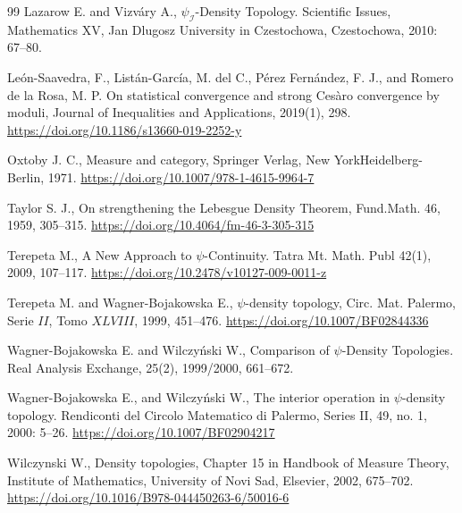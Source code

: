 \documentclass{amsart}
\theoremstyle{plain}
\numberwithin{equation}{section}
\begin{document}
\begin{thebibliography}{99}
Lazarow E. and Vizváry A., $\psi_{\mathcal{I}}$-Density Topology. Scientific Issues, Mathematics XV, Jan Dlugosz University in Czestochowa, Czestochowa, 2010: 67--80.

León-Saavedra, F., Listán-García, M. del C., Pérez Fernández, F. J., and Romero de la Rosa, M. P. On statistical convergence and strong Cesàro convergence by moduli, Journal of Inequalities and Applications, 2019(1), 298. \url{https://doi.org/10.1186/s13660-019-2252-y}

Oxtoby J. C., Measure and category, Springer Verlag, New YorkHeidelberg-Berlin, 1971. \url{https://doi.org/10.1007/978-1-4615-9964-7}

Taylor S. J., On strengthening the Lebesgue Density Theorem, Fund.Math. 46, 1959, 305--315. \url{https://doi.org/10.4064/fm-46-3-305-315}

Terepeta M., A New Approach to $\psi$-Continuity. Tatra Mt. Math. Publ 42(1), 2009, 107--117. \url{https://doi.org/10.2478/v10127-009-0011-z}

Terepeta M. and Wagner-Bojakowska E., $\psi$-density topology, Circ. Mat. Palermo, Serie $II$, Tomo $XLVIII$, 1999, 451--476. \url{https://doi.org/10.1007/BF02844336}

Wagner-Bojakowska E. and Wilczyński W., Comparison of $\psi$-Density Topologies. Real Analysis Exchange, 25(2), 1999/2000, 661--672.

Wagner-Bojakowska E., and Wilczyński W., The interior operation in $\psi$-density topology. Rendiconti del Circolo Matematico di Palermo, Series II, 49, no. 1, 2000: 5--26. \url{https://doi.org/10.1007/BF02904217}

Wilczynski W., Density topologies, Chapter 15 in Handbook of Measure Theory, Institute of Mathematics, University of Novi Sad, Elsevier, 2002, 675--702. \url{https://doi.org/10.1016/B978-044450263-6/50016-6}


\end{thebibliography}
\end{document}
